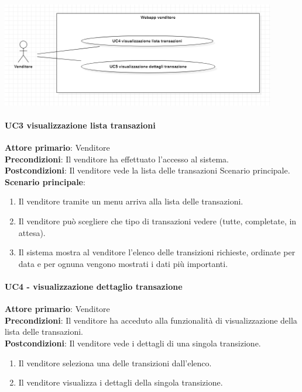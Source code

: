 \documentclass[a4paper, 12pt]{article}
\begin{document}
\includegraphics[width=0.9\textwidth]{UseCase_venditore3.png}

\paragraph{UC3 visualizzazione lista transazioni}
\textbf{Attore primario}: Venditore \\
\textbf{Precondizioni}: Il venditore ha effettuato l'accesso al sistema.\\
\textbf{Postcondizioni}:  Il venditore vede la lista delle transazioni
Scenario principale.\\
\textbf{Scenario principale}:
\begin{enumerate}
\item Il venditore tramite un menu arriva alla lista delle transazioni.
\item Il venditore può scegliere che tipo di transazioni vedere (tutte, completate, in attesa).
\item Il sistema mostra al venditore l'elenco delle transizioni richieste, ordinate per data e per ognuna vengono mostrati i dati più importanti.
\end{enumerate}

\paragraph{UC4 - visualizzazione dettaglio transazione}
\textbf{Attore primario}: Venditore\\
\textbf{Precondizioni}: Il venditore ha acceduto alla funzionalità di visualizzazione della lista delle transazioni.\\
\textbf{Postcondizioni}: Il venditore vede i dettagli di una singola transizione.\\
\begin{enumerate}
\item Il venditore seleziona una delle transizioni dall'elenco.
\item Il venditore visualizza i dettagli della singola transizione.
\end{enumerate}
\end{document}
